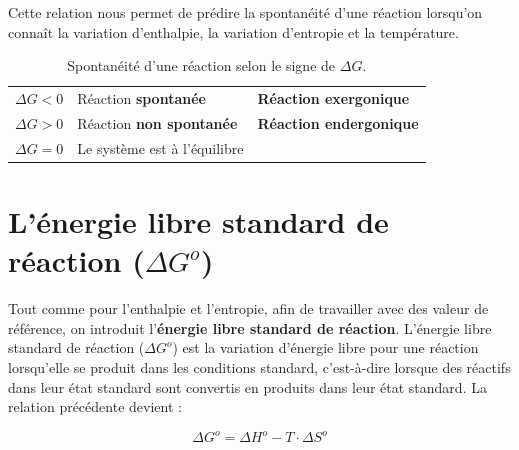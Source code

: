 \documentclass[
  11pt,
  a4paper,
  openany]{book}
\begin{document}
Cette relation nous permet de prédire la spontanéité d'une réaction lorsqu'on connaît la variation d'enthalpie, la variation d'entropie et la température.

\begin{longtable}[]{@{}
  >{\centering\arraybackslash}p{}
  >{\raggedright\arraybackslash}p{}
  >{\raggedright\arraybackslash}p{}@{}}
\caption{\label{tab:spontaneitedHdS} Spontanéité d'une réaction selon le signe de \(\Delta G\).}\tabularnewline
\toprule\noalign{}
\endfirsthead
\endhead
\bottomrule\noalign{}
\endlastfoot
\(\Delta G < 0\) & Réaction \textbf{spontanée} & \textbf{Réaction exergonique} \\
\(\Delta G > 0\) & Réaction \textbf{non spontanée} & \textbf{Réaction endergonique} \\
\(\Delta G = 0\) & Le système est à l'équilibre & \\
\end{longtable}

\section{\texorpdfstring{L'énergie libre standard de réaction (\(\Delta G^o\))}{L'énergie libre standard de réaction (\textbackslash Delta G\^{}o)}}\label{luxe9nergie-libre-standard-de-ruxe9action-delta-go}

Tout comme pour l'enthalpie et l'entropie, afin de travailler avec des valeur de référence, on introduit l'\textbf{énergie libre standard de réaction}. L'énergie libre standard de réaction (\(\Delta G^o\)) est la variation d'énergie libre pour une réaction lorsqu'elle se produit dans les conditions standard, c'est-à-dire lorsque des réactifs dans leur état standard sont convertis en produits dans leur état standard. La relation précédente devient :

\[
\Delta G^o = \Delta H^o - T \cdot \Delta S^o
\]
\end{document}
